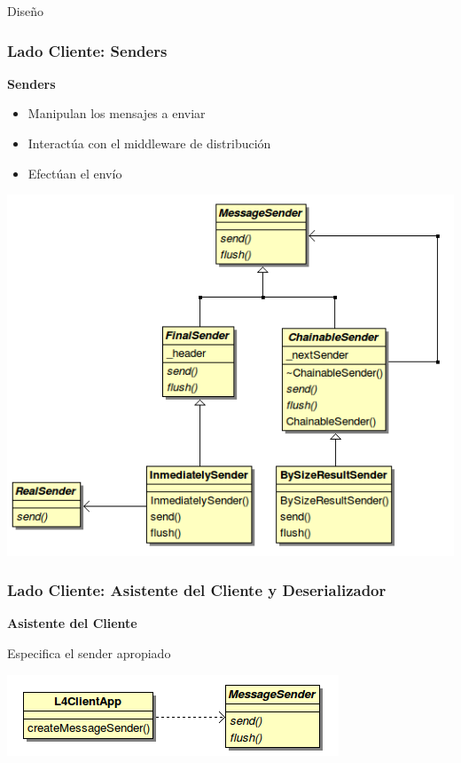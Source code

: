 \begin{subsection}{Diseño}
\begin{frame}\frametitle{Lado Cliente: Senders}
    \textbf{Senders}

    \begin{itemize}
        \item Manipulan los mensajes a enviar
        \item Interactúa con el middleware de distribución
        \item Efectúan el envío
    \end{itemize}

    \begin{center}
     \includegraphics[scale=0.3]{images/senders.png}
    \end{center}
\end{frame}

\begin{frame}\frametitle{Lado Cliente: Asistente del Cliente y Deserializador}
    \textbf{Asistente del Cliente}

        Especifica el sender apropiado

    \begin{center}
        \includegraphics[scale=0.4]{images/l4_client_app.png}
    \end{center}


\end{frame}
\end{subsection}
